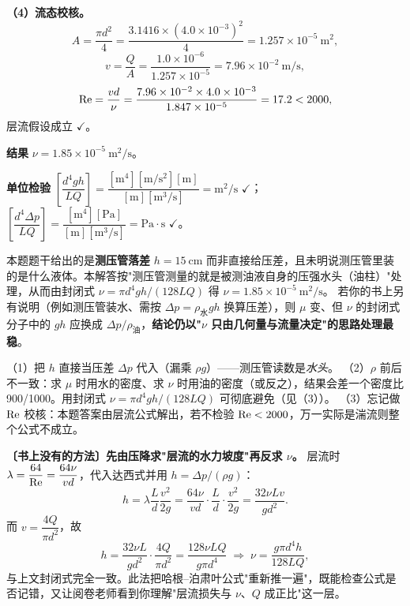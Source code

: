 \begin{jie}
\textbf{（4）流态校核。}
\[A=\frac{\pi d^2}{4}=\frac{3.1416\times(4.0\times10^{-3})^2}{4}=1.257\times10^{-5}\ \mathrm{m^2},\]
\[v=\frac{Q}{A}=\frac{1.0\times10^{-6}}{1.257\times10^{-5}}=7.96\times10^{-2}\ \mathrm{m/s},\]
\[\mathrm{Re}=\frac{vd}{\nu}=\frac{7.96\times10^{-2}\times4.0\times10^{-3}}{1.847\times10^{-5}}=17.2<2000,\]
层流假设成立 $\checkmark$。

\textbf{结果} $\boxed{\nu=1.85\times10^{-5}\ \mathrm{m^2/s}}$。

\textbf{单位检验} $\left[\dfrac{d^4gh}{LQ}\right]=\dfrac{[\mathrm{m^4}][\mathrm{m/s^2}][\mathrm{m}]}{[\mathrm{m}][\mathrm{m^3/s}]}=\mathrm{m^2/s}$ $\checkmark$；$\left[\dfrac{d^4\Delta p}{LQ}\right]=\dfrac{[\mathrm{m^4}][\mathrm{Pa}]}{[\mathrm{m}][\mathrm{m^3/s}]}=\mathrm{Pa\cdot s}$ $\checkmark$。
\end{jie}
\begin{tishi}
本题题干给出的是\textbf{测压管落差} $h=15\ \mathrm{cm}$ 而非直接给压差，且未明说测压管里装的是什么液体。本解答按"测压管测量的就是被测油液自身的压强水头（油柱）"处理，从而由封闭式 $\nu=\pi d^4gh/(128LQ)$ 得 $\nu=1.85\times10^{-5}\ \mathrm{m^2/s}$。
若你的书上另有说明（例如测压管装水、需按 $\Delta p=\rho_{\text{水}}gh$ 换算压差），则 $\mu$ 变、但 $\nu$ 的封闭式分子中的 $g h$ 应换成 $\Delta p/\rho_{\text{油}}$，\textbf{结论仍以"$\nu$ 只由几何量与流量决定"的思路处理最稳}。
\end{tishi}
\begin{yicuo}
（1）把 $h$ 直接当压差 $\Delta p$ 代入（漏乘 $\rho g$）——测压管读数是\emph{水头}。
（2）$\rho$ 前后不一致：求 $\mu$ 时用水的密度、求 $\nu$ 时用油的密度（或反之），结果会差一个密度比 900/1000。用封闭式 $\nu=\pi d^4gh/(128LQ)$ 可彻底避免（见（3））。
（3）忘记做 $\mathrm{Re}$ 校核：本题答案由层流公式解出，若不检验 $\mathrm{Re}<2000$，万一实际是湍流则整个公式不成立。
\end{yicuo}
\begin{banfa}
\textbf{〔书上没有的方法〕先由压降求"层流的水力坡度"再反求 $\nu$。} 层流时 $\lambda=\dfrac{64}{\mathrm{Re}}=\dfrac{64\nu}{vd}$，代入达西式并用 $h=\Delta p/(\rho g)$：
\[h=\lambda\frac{L}{d}\frac{v^2}{2g}=\frac{64\nu}{vd}\cdot\frac{L}{d}\cdot\frac{v^2}{2g}=\frac{32\nu Lv}{gd^2}.\]
而 $v=\dfrac{4Q}{\pi d^2}$，故
\[h=\frac{32\nu L}{gd^2}\cdot\frac{4Q}{\pi d^2}=\frac{128\nu LQ}{g\pi d^4}
\;\Longrightarrow\;\nu=\frac{g\pi d^4 h}{128LQ},\]
与上文封闭式完全一致。此法把哈根--泊肃叶公式"重新推一遍"，既能检查公式是否记错，又让阅卷老师看到你理解"层流损失与 $\nu$、$Q$ 成正比"这一层。
\end{banfa}


